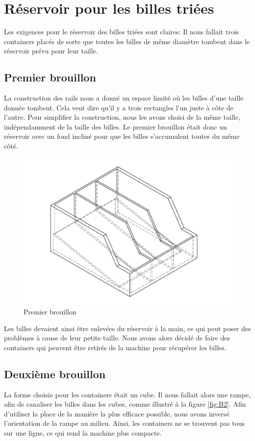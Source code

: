 \section{Réservoir pour les billes triées}
Les exigences pour le réservoir des billes triées sont claires: Il nous fallait trois containers placés de sorte que toutes les billes de même diamètre tombent dans le réservoir prévu pour leur taille.

\subsection{Premier brouillon}
La construction des rails nous a donné un espace limité où les billes d'une taille donnée tombent. Cela veut dire qu'il y a trois rectangles l'un juste à côte de l'autre. Pour simplifier la construction, nous les avons choisi de la même taille, indépendamment de la taille des billes. Le premier brouillon était donc un réservoir avec un fond incliné pour que les billes s'accumulent toutes du même côté.

\begin{figure}
    \centering
    \includegraphics[width=\textwidth]{Graphics/Reservoir_final/PREMIER_BROUILLON.pdf}
    \caption{Premier brouillon}
\end{figure}

Les billes devaient ainsi être enlevées du réservoir à la main, ce qui peut poser des problèmes à cause de leur petite taille. Nous avons alors décidé de faire des containers qui peuvent être retirés de la machine pour récupérer les billes. 

\subsection{Deuxième brouillon}
La forme choisie pour les containers était un cube. Il nous fallait alors une rampe, afin de canaliser les billes dans les cubes, comme illustré à la figure \ref{fig:B2}. Afin d'utiliser la place de la manière la plus efficace possible, nous avons inversé l'orientation de la rampe au milieu. Ainsi, les containers ne se trouvent pas tous sur une ligne, ce qui rend la machine plus compacte. 

